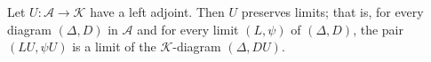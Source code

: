 Let $U\colon \mathcal{A} \rightarrow \mathcal{K}$ have a left adjoint. Then $U$ preserves limits; that is, for every diagram $(\Delta, D)$ in $\mathcal{A}$ and for every limit $(L, \psi)$ of $(\Delta, D)$, the pair $(LU, \psi U)$ is a limit of the $\mathcal{K}$-diagram $(\Delta, DU)$.
